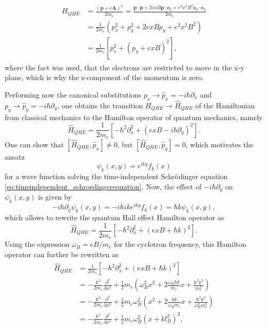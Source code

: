 \documentclass{report}
\numberwithin{tm}{section}
\newcommand\vect[1]{\ensuremath{\bm{#1}}}
\begin{document}
\begin{align}
\begin{aligned}
H_{QHE} &= \frac{(\vect{p}+e\vect{A})^2}{2m_e} = \frac{\vect{p}\cdot\vect{p} + 2exB\vect{p}\cdot \vect{e}_y + e^2x^2B^2\vect{e}_y\cdot \vect{e}_y}{2m_e} \\
&= \frac{1}{2m_e}\left(p_x^2 + p_y^2 + 2exBp_y + e^2x^2B^2\right) \\ &= \frac{1}{2m_e}\left[p_x^2 + (p_y + exB)^2\right],
\end{aligned}\end{align} where the fact was used, that the electrons are restricted to move in the x-y plane, which is why the z-component of the momentum is zero.

Performing now the canonical substitutions $p_x \rightarrow \hat{p}_x = -i\hbar\partial_x$ and $p_y \rightarrow \hat{p}_y = -i\hbar\partial_y$, one obtains the transition $H_{QHE} \rightarrow \hat{H}_{QHE}$ of the Hamiltonian from classical mechanics to the Hamilton operator of quantum mechanics, namely \begin{equation}
	\hat{H}_{QHE} = \frac{1}{2m_e}\left[-\hbar^2\partial_x^2 + (exB-i\hbar\partial_y)^2\right].
\end{equation} One can show that $[\hat{H}_{QHE}, \hat{p}_x] \neq 0$, but $[\hat{H}_{QHE}, \hat{p}_y] = 0$, which motivates the ansatz \begin{equation}
\psi_k(x,y) = e^{iky}f_k(x)
\end{equation} for a wave function solving the time-independent Schrödinger equation \cref{eq:timeindependent_schroedingerequation}. Now, the effect of $-i\hbar\partial_y$ on $\psi_k(x,y)$ is given by \begin{equation}
-i\hbar\partial_y \psi_k(x,y) = -i\hbar i k e^{iky}f_k(x) = \hbar k \psi_k(x,y),
\end{equation} which allows to rewrite the quantum Hall effect Hamilton operator as \begin{equation}
\hat{H}_{QHE} = \frac{1}{2m_e}\left[-\hbar^2\partial_x^2 + (exB + \hbar k)^2\right].
\end{equation} Using the expression $\omega_B = eB/m_e$ for the cyclotron frequency, this Hamilton operator can further be rewritten as \begin{align}
\begin{aligned}
	\hat{H}_{QHE} &= \frac{1}{2m_e}\left[-\hbar^2\partial_x^2 + (exB + \hbar k)^2\right]
 \\ &= -\frac{\hbar^2}{2m_e}\frac{\partial^2}{\partial x^2} + \frac{1}{2}m_e\left(\omega_B^2 x^2 + 2\frac{\omega_B \hbar k}{m_e}x + \frac{\hbar^2 k^2}{m_e^2}\right) \\ &= -\frac{\hbar^2}{2m_e}\frac{\partial^2}{\partial x^2} + \frac{1}{2}m_e\omega_B^2\left(x^2 + 2\frac{\hbar k}{\omega_B m_e}x + \frac{\hbar^2 k^2}{\omega_B^2 m_e^2}\right) \\ &= -\frac{\hbar^2}{2m_e}\frac{\partial^2}{\partial x^2} + \frac{1}{2}m_e\omega_B^2\left(x + kl_B^2\right)^2,

\end{aligned}
\end{align}
\end{document}
